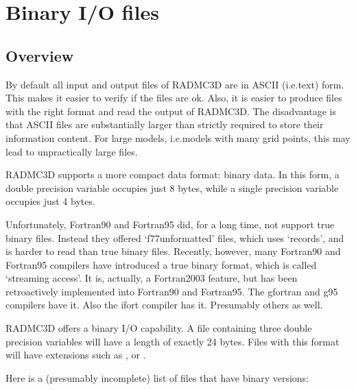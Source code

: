 \documentclass[letterpaper,10pt,english]{sphinxmanual}
\begin{document}
\chapter{Binary I/O files}
\label{\detokenize{binaryio:binary-i-o-files}}\label{\detokenize{binaryio:chap-binary-io}}\label{\detokenize{binaryio::doc}}

\section{Overview}
\label{\detokenize{binaryio:overview}}\label{\detokenize{binaryio:sec-unformatted-overview}}
By default all input and output files of RADMC\sphinxhyphen{}3D are in ASCII (i.e.text)
form. This makes it easier to verify if the files are ok. Also, it is easier
to produce files with the right format and read the output of RADMC\sphinxhyphen{}3D. The
disadvantage is that ASCII files are substantially larger than strictly
required to store their information content. For large models, i.e.models
with many grid points, this may lead to unpractically large files.

RADMC\sphinxhyphen{}3D supports a more compact data format: binary data. In this form, a
double precision variable occupies just 8 bytes, while a single precision
variable occupies just 4 bytes.

Unfortunately, Fortran\sphinxhyphen{}90 and Fortran\sphinxhyphen{}95 did, for a long time, not support true
binary files. Instead they offered ‘f77\sphinxhyphen{}unformatted’ files, which uses
‘records’, and is harder to read than true binary files. Recently, however, many
Fortran\sphinxhyphen{}90 and Fortran\sphinxhyphen{}95 compilers have introduced a true binary format, which
is called ‘streaming access’. It is, actually, a Fortran\sphinxhyphen{}2003 feature, but has
been retroactively implemented into Fortran\sphinxhyphen{}90 and Fortran\sphinxhyphen{}95. The gfortran and
g95 compilers have it. Also the ifort compiler has it. Presumably others as
well.

RADMC\sphinxhyphen{}3D offers a binary I/O capability. A file containing three double
precision variables will have a length of exactly 24 bytes. Files with this
format will have extensions such as ,  or .

Here is a (presumably incomplete) list of files that have binary versions:
\end{document}
